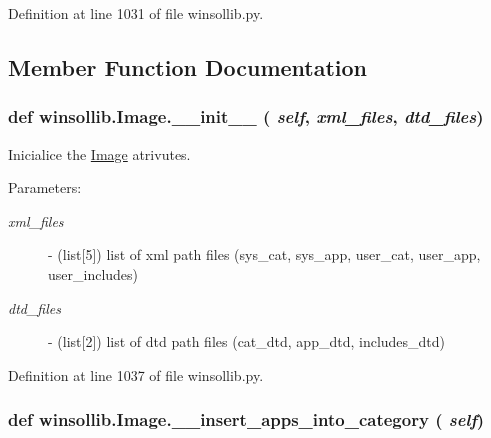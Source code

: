 Definition at line 1031 of file winsollib.py.

\subsection{Member Function Documentation}
\hypertarget{classwinsollib_1_1Image_7731ccc6d05f839e203fa017e4433845}{
\subsubsection[\_\-\_\-init\_\-\_\-]{\setlength{\rightskip}{0pt plus 5cm}def winsollib.Image.\_\-\_\-init\_\-\_\- ( {\em self},  {\em xml\_\-files},  {\em dtd\_\-files})}}
\label{classwinsollib_1_1Image_7731ccc6d05f839e203fa017e4433845}


Inicialice the \hyperlink{classwinsollib_1_1Image}{Image} atrivutes. 

\begin{Desc}
\item[Parameters:]
\begin{description}
\item[{\em xml\_\-files}]- (list\mbox{[}5\mbox{]}) list of xml path files (sys\_\-cat, sys\_\-app, user\_\-cat, user\_\-app, user\_\-includes) \item[{\em dtd\_\-files}]- (list\mbox{[}2\mbox{]}) list of dtd path files (cat\_\-dtd, app\_\-dtd, includes\_\-dtd) \end{description}
\end{Desc}


Definition at line 1037 of file winsollib.py.\hypertarget{classwinsollib_1_1Image_4b7424fab5eef4b7b1ad815ad5b9c573}{
\subsubsection[\_\-\_\-insert\_\-apps\_\-into\_\-category]{\setlength{\rightskip}{0pt plus 5cm}def winsollib.Image.\_\-\_\-insert\_\-apps\_\-into\_\-category ( {\em self})}}
\label{classwinsollib_1_1Image_4b7424fab5eef4b7b1ad815ad5b9c573}


